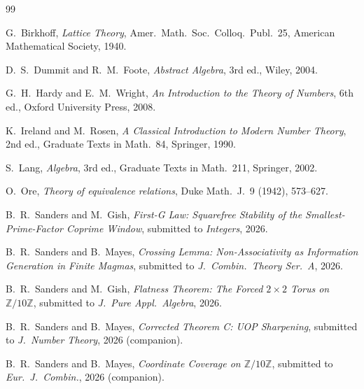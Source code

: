 \documentclass[11pt,reqno]{amsart}
\theoremstyle{plain}
\theoremstyle{definition}
\newcommand{\Z}{\mathbb{Z}}
\begin{document}
\begin{thebibliography}{99}

G.~Birkhoff,
\emph{Lattice Theory},
Amer.\ Math.\ Soc.\ Colloq.\ Publ.\ 25,
American Mathematical Society, 1940.

D.~S.~Dummit and R.~M.~Foote,
\emph{Abstract Algebra}, 3rd ed.,
Wiley, 2004.

G.~H.~Hardy and E.~M.~Wright,
\emph{An Introduction to the Theory of Numbers}, 6th ed.,
Oxford University Press, 2008.

K.~Ireland and M.~Rosen,
\emph{A Classical Introduction to Modern Number Theory}, 2nd ed.,
Graduate Texts in Math.\ 84, Springer, 1990.

S.~Lang,
\emph{Algebra}, 3rd ed.,
Graduate Texts in Math.\ 211, Springer, 2002.

O.~Ore,
\emph{Theory of equivalence relations},
Duke Math.\ J.\ 9 (1942), 573--627.

B.~R.~Sanders and M.~Gish,
\emph{First-G Law: Squarefree Stability of the Smallest-Prime-Factor Coprime Window},
submitted to \emph{Integers}, 2026.

B.~R.~Sanders and B.~Mayes,
\emph{Crossing Lemma: Non-Associativity as Information Generation in Finite Magmas},
submitted to \emph{J.\ Combin.\ Theory Ser.\ A}, 2026.

B.~R.~Sanders and M.~Gish,
\emph{Flatness Theorem: The Forced $2 \times 2$ Torus on $\Z/10\Z$},
submitted to \emph{J.\ Pure Appl.\ Algebra}, 2026.

B.~R.~Sanders and B.~Mayes,
\emph{Corrected Theorem C: UOP Sharpening},
submitted to \emph{J.\ Number Theory}, 2026 (companion).

B.~R.~Sanders and B.~Mayes,
\emph{Coordinate Coverage on $\Z/10\Z$},
submitted to \emph{Eur.\ J.\ Combin.}, 2026 (companion).

\end{thebibliography}
\end{document}
